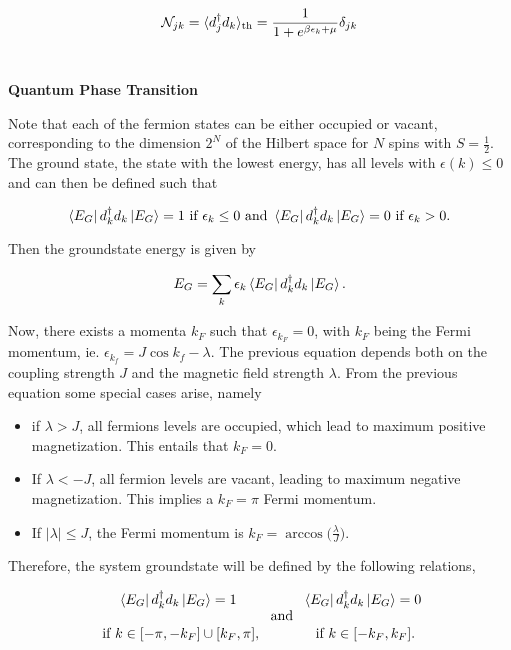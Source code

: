 \documentclass{homework}
\begin{document}
\begin{equation}
    \mathcal{N}_{jk} = \langle d_j^\dagger d_k \rangle_{\textnormal{th}} =  \frac{1}{1+e^{\beta \epsilon_k + \mu}} \delta_{jk} 
\end{equation} \\

\clearpage

\textbf{Quantum Phase Transition}

Note that each of the fermion states can be either occupied or vacant, corresponding to the dimension $2^N$ of the Hilbert space for $N$ spins with $S = \frac{1}{2}$. The ground state, the state with the lowest energy, has all levels with $\epsilon(k) \leq 0$ and can then be defined such that

\begin{equation}
    \bra{E_G} d_k^\dagger d_k \ket{E_G} = 1 \textnormal{ if } \epsilon_k \leq 0 \textnormal{ and } \bra{E_G} d_k^\dagger d_k \ket{E_G} = 0 \textnormal{ if } \epsilon_k > 0.
\end{equation}

Then the groundstate energy is given by 

\begin{equation}
    E_G = \sum_{k} \epsilon_k \bra{E_G} d_k^\dagger d_k \ket{E_G}.
\end{equation}

Now, there exists a momenta $k_F$ such that $\epsilon_{k_F} = 0$, with $k_F$ being the Fermi momentum, ie. $\epsilon_{k_f} = J \cos k_f - \lambda$. The previous equation depends both on the coupling strength $J$ and the magnetic field strength $\lambda$. From the previous equation some special cases arise, namely 

\begin{itemize}
    \item if $\lambda > J$, all fermions levels are occupied, which lead to maximum positive magnetization. This entails that $k_F = 0$.
    \item If $\lambda < -J$, all fermion levels are vacant, leading to maximum negative magnetization. This implies a $k_F = \pi$ Fermi momentum.
    \item If $|\lambda| \leq J$, the Fermi momentum is $k_F = \arccos \bigg(\frac{\lambda}{J}\bigg)$.
\end{itemize}

Therefore, the system groundstate will be defined by the following relations, 

\begin{equation}
    \begin{array}{c}
         \bra{E_G} d_k^\dagger d_k \ket{E_G} = 1  \\
         \\
         \textnormal{ if } k \in [-\pi, -k_F] \cup [k_F, \pi],
    \end{array} \textnormal{ and }  \begin{array}{c}
         \bra{E_G} d_k^\dagger d_k \ket{E_G} = 0  \\
         \\
         \textnormal{ if } k \in [-k_F, k_F].
    \end{array}
\end{equation}
\end{document}
